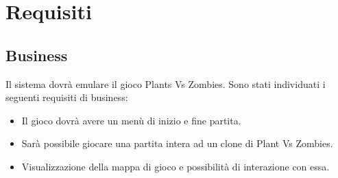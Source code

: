 \section{Requisiti}

\subsection{Business}
Il sistema dovrà emulare il gioco Plants Vs Zombies.
Sono stati individuati i seguenti requisiti di business:
\begin{itemize}
    \item Il gioco dovrà avere un menù di inizio e fine partita.
    \item Sarà possibile giocare una partita intera ad un clone di Plant Vs Zombies.
    \item Visualizzazione della mappa di gioco e possibilità di interazione con essa.
\end{itemize}

